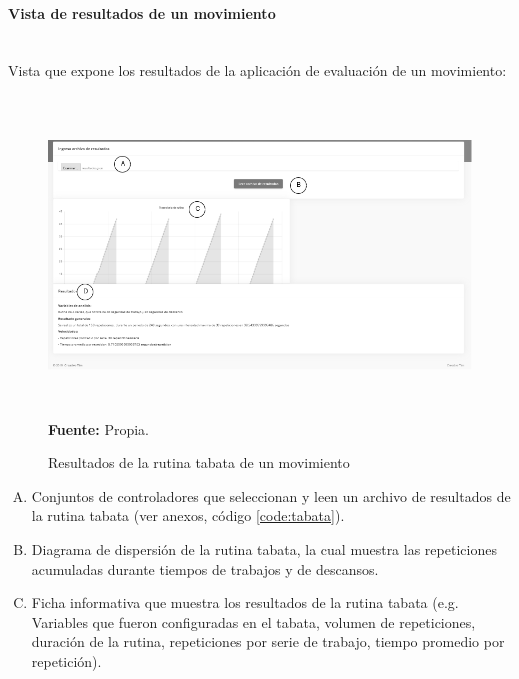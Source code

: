 \paragraph{Vista de resultados de un movimiento}\mbox{} \\ \label{ins:UI:web:result}
Vista que expone los resultados de la aplicaci\'on de evaluaci\'on de un movimiento:
\begin{figure}[H]
	\caption{Resultados de la rutina tabata de un movimiento}
	\label{fig:resultsTabata}
	\centering
	\includegraphics[width=460px,height=320px]{graphics/web-results.PNG} \\
	\textbf{Fuente:} Propia.
\end{figure}
\begin{enumerate}[A.]
\item Conjuntos de controladores que seleccionan y leen un archivo de resultados de la rutina tabata (ver anexos, c\'odigo \ref{code:tabata}).
\item Diagrama de dispersi\'on de la rutina tabata, la cual muestra las repeticiones acumuladas durante tiempos de trabajos y de descansos.
\item Ficha informativa que muestra los resultados de la rutina tabata (e.g. Variables que fueron configuradas en el tabata, volumen de repeticiones, duraci\'on de la rutina, repeticiones por serie de trabajo, tiempo promedio por repetici\'on).
\end{enumerate}
